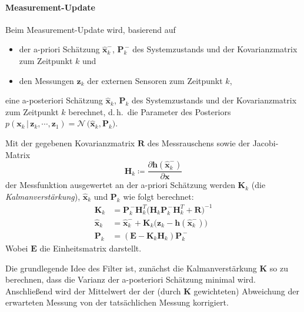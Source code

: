 \documentclass[a4paper, 11pt, accentcolor = tud3b]{tudreport}
\newcommand{\given}{\,\vert\,}
\newcommand{\mat}[1]{\boldsymbol{#1}}
\renewcommand{\vec}[1]{\boldsymbol{\mathbf{#1}}}
\renewcommand{\dh}{d.\,h.~}
\begin{document}
					\paragraph{Measurement-Update} %
						Beim Measurement-Update wird, basierend auf
						\begin{itemize}
							\item der a-priori Schätzung \( \hat{\vec{x}}_k^- \), \( \mat{P}_k^{\,-} \) des Systemzustands und der Kovarianzmatrix zum Zeitpunkt \(k\) und
							\item den Messungen \( \vec{z}_k \) der externen Sensoren zum Zeitpunkt \(k\),
						\end{itemize}
						eine a-posteriori Schätzung \( \hat{\vec{x}}_k \), \( \mat{P}_k \) des Systemzustands und der Kovarianzmatrix zum Zeitpunkt \(k\) berechnet, \dh die Parameter des Posteriors \( p(\vec{x}_k \given \vec{z}_k, \cdots, \vec{z}_1) = \mathcal{N}\,\big(\hat{\vec{x}}_k, \mat{P}_k\big) \).
						
						Mit der gegebenen Kovarianzmatrix \( \mat{R} \) des Messrauschens sowie der Jacobi-Matrix
						\begin{equation*}
							\mat{H}_k \coloneqq \frac{\partial \vec{h}(\hat{\vec{x}}_k^-)}{\partial \vec{x}}
						\end{equation*}
						der Messfunktion ausgewertet an der a-priori Schätzung werden \( \mat{K}_k \) (die \emph{Kalmanverstärkung}), \( \hat{\vec{x}}_k \) und \( \mat{P}_k \) wie folgt berechnet:
						\begin{align*}
							\mat{K}_k &= \mat{P}_k^{\,-} \mat{H}_k^T \big( \mat{H}_k \mat{P}_k^{\,-} \mat{H}_k^T + \mat{R} \big)^{-1} \\
							\hat{\vec{x}}_k &= \hat{\vec{x}}_k^- + \mat{K}_k \big( \vec{z}_k - \vec{h}(\hat{\vec{x}}_k^-) \big) \\
							\mat{P}_k &= (\mat{E} - \mat{K}_k \mat{H}_k) \mat{P}_k^{\,-}
						\end{align*}
						Wobei \( \mat{E} \) die Einheitsmatrix darstellt.
						
						Die grundlegende Idee des Filter ist, zunächst die Kalmanverstärkung \( \mat{K} \) so zu berechnen, dass die Varianz der a-posteriori Schätzung minimal wird. Anschließend wird der Mittelwert der der (durch \( \mat{K} \) gewichteten) Abweichung der erwarteten Messung von der tatsächlichen Messung korrigiert.
						
\end{document}
